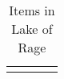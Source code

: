 \begin{longtable}{|| l l l l ||}%
\hline%
\endhead%
\hline%
\caption{Items in Lake of Rage}%
\label{tab:LakeofRageItems}%
\end{longtable}